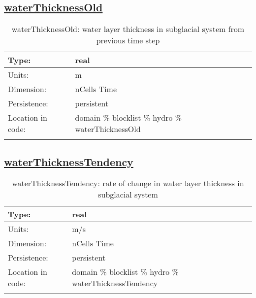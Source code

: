 \subsection[waterThicknessOld]{\hyperref[sec:var_tab_hydro]{waterThicknessOld}}
\label{subsec:var_sec_hydro_waterThicknessOld}
\begin{center}
\begin{longtable}{| p{2.0in} | p{4.0in} |}
        \hline 
        Type: & real \\
        \hline 
        Units: & \si{m} \\
        \hline 
        Dimension: & nCells Time \\
        \hline 
        Persistence: & persistent \\
        \hline 
         Location in code: & domain \% blocklist \% hydro \% waterThicknessOld \\
         \hline 
    \caption{waterThicknessOld: water layer thickness in subglacial system from previous time step}
\end{longtable}
\end{center}
\subsection[waterThicknessTendency]{\hyperref[sec:var_tab_hydro]{waterThicknessTendency}}
\label{subsec:var_sec_hydro_waterThicknessTendency}
\begin{center}
\begin{longtable}{| p{2.0in} | p{4.0in} |}
        \hline 
        Type: & real \\
        \hline 
        Units: & \si{m/s} \\
        \hline 
        Dimension: & nCells Time \\
        \hline 
        Persistence: & persistent \\
        \hline 
         Location in code: & domain \% blocklist \% hydro \% waterThicknessTendency \\
         \hline 
    \caption{waterThicknessTendency: rate of change in water layer thickness in subglacial system}
\end{longtable}
\end{center}
